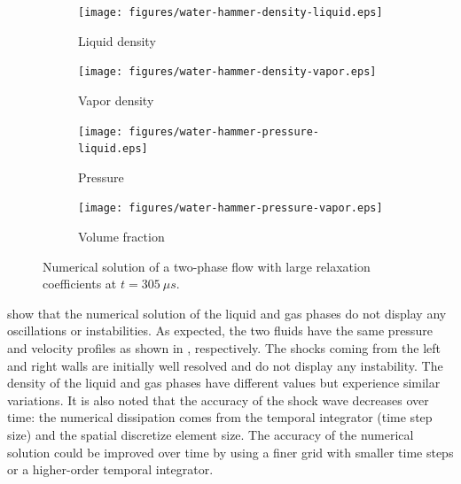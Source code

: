 \documentclass[preprint,10pt]{elsarticle}
\begin{document}
\begin{figure}[H]
        \centering
        \begin{subfigure}[b]{0.495\textwidth}
                \centering
                \texttt{[image: figures/water-hammer-density-liquid.eps]}
                \caption{Liquid density}
                \label{fig:water-hammer-density-liq}
        \end{subfigure}%
        \begin{subfigure}[b]{0.495\textwidth}
                \centering
                \texttt{[image: figures/water-hammer-density-vapor.eps]}
                \caption{Vapor density}
                \label{fig:water-hammer-density-vap}
        \end{subfigure}
        
        \begin{subfigure}[b]{0.495\textwidth}
                \centering
                \texttt{[image: figures/water-hammer-pressure-liquid.eps]}
                \caption{Pressure}
                \label{fig:water-hammer-press-liq}
        \end{subfigure}        
        \begin{subfigure}[b]{0.495\textwidth}
                \centering
                \texttt{[image: figures/water-hammer-pressure-vapor.eps]}
                \caption{Volume fraction}
                \label{fig:water-hammer-press-vap}
        \end{subfigure}
        \caption{Numerical solution of a two-phase flow with large relaxation coefficients at $t=305 \ \mu s$.}\label{fig:water-hammer-var}
\end{figure}
%
 show that the numerical solution of the liquid and gas phases do not display any oscillations or instabilities. 
As expected, the two fluids have the same pressure and velocity profiles as shown in , respectively. The shocks coming from the left and right walls are initially well resolved and do not display any instability. The density of the liquid and gas phases have different values but experience similar variations. It is also noted that the accuracy of the shock wave decreases over time: the numerical dissipation comes from the temporal integrator (time step size) and the spatial discretize element size. The accuracy of the numerical solution could be improved over time by using a finer grid with smaller time steps or a higher-order temporal integrator.
%
\end{document}

